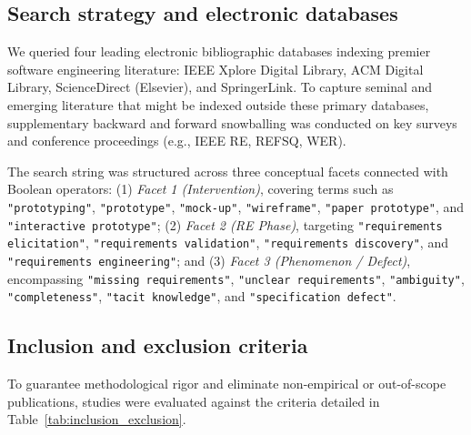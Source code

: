 \documentclass[conference]{IEEEtran}
\begin{document}
\subsection{Search strategy and electronic databases}
We queried four leading electronic bibliographic databases indexing premier software engineering literature: IEEE Xplore Digital Library, ACM Digital Library, ScienceDirect (Elsevier), and SpringerLink. To capture seminal and emerging literature that might be indexed outside these primary databases, supplementary backward and forward snowballing was conducted on key surveys and conference proceedings (e.g., IEEE RE, REFSQ, WER).

The search string was structured across three conceptual facets connected with Boolean operators: (1) \textit{Facet 1 (Intervention)}, covering terms such as \texttt{"prototyping"}, \texttt{"prototype"}, \texttt{"mock-up"}, \texttt{"wireframe"}, \texttt{"paper prototype"}, and \texttt{"interactive prototype"}; (2) \textit{Facet 2 (RE Phase)}, targeting \texttt{"requirements elicitation"}, \texttt{"requirements validation"}, \texttt{"requirements discovery"}, and \texttt{"requirements engineering"}; and (3) \textit{Facet 3 (Phenomenon / Defect)}, encompassing \texttt{"missing requirements"}, \texttt{"unclear requirements"}, \texttt{"ambiguity"}, \texttt{"completeness"}, \texttt{"tacit knowledge"}, and \texttt{"specification defect"}.

\subsection{Inclusion and exclusion criteria}
To guarantee methodological rigor and eliminate non-empirical or out-of-scope publications, studies were evaluated against the criteria detailed in Table~\ref{tab:inclusion_exclusion}.
\end{document}
